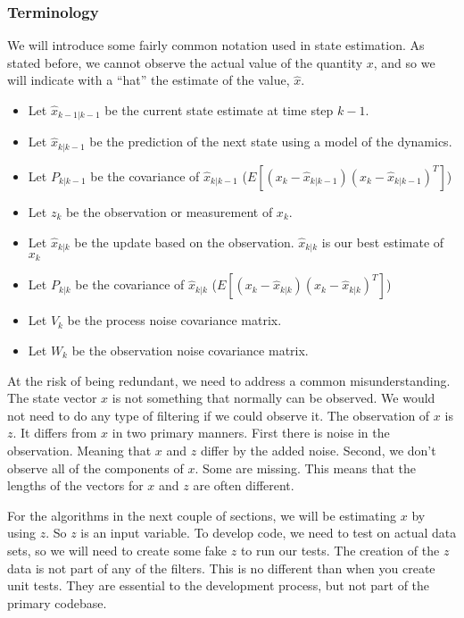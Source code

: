 \hypertarget{terminology}{%
\subsubsection{Terminology}\label{terminology}}

We will introduce some fairly common notation used in state estimation.
As stated before, we cannot observe the actual value of the quantity
\(x\), and so we will indicate with a ``hat'' the estimate of the value,
\(\hat{x}\).

\begin{itemize}
\tightlist
\item
  Let \(\hat{x}_{k-1|k-1}\) be the current state estimate at time step
  \(k-1\).
\item
  Let \(\hat{x}_{k|k-1}\) be the prediction of the next state using a
  model of the dynamics.
\item
  Let \(P_{k|k-1}\) be the covariance of \(\hat{x}_{k|k-1}\)
  (\(E[(x_k-\hat{x}_{k|k-1})(x_k-\hat{x}_{k|k-1})^T]\))
\item
  Let \(z_{k}\) be the observation or measurement of \(x_{k}\).
\item
  Let \(\hat{x}_{k|k}\) be the update based on the observation.
  \(\hat{x}_{k|k}\) is our best estimate of \(x_{k}\)
\item
  Let \(P_{k|k}\) be the covariance of \(\hat{x}_{k|k}\)
  (\(E[(x_k-\hat{x}_{k|k})(x_k-\hat{x}_{k|k})^T]\))
\item
  Let \(V_k\) be the process noise covariance matrix.
\item
  Let \(W_k\) be the observation noise covariance matrix.
\end{itemize}

At the risk of being redundant, we need to address a common
misunderstanding. The state vector \(x\) is not something that normally
can be observed. We would not need to do any type of filtering if we
could observe it. The observation of \(x\) is \(z\). It differs from
\(x\) in two primary manners. First there is noise in the observation.
Meaning that \(x\) and \(z\) differ by the added noise. Second, we don't
observe all of the components of \(x\). Some are missing. This means
that the lengths of the vectors for \(x\) and \(z\) are often different.

For the algorithms in the next couple of sections, we will be estimating
\(x\) by using \(z\). So \(z\) is an input variable. To develop code, we
need to test on actual data sets, so we will need to create some fake
\(z\) to run our tests. The creation of the \(z\) data is not part of
any of the filters. This is no different than when you create unit
tests. They are essential to the development process, but not part of
the primary codebase.


